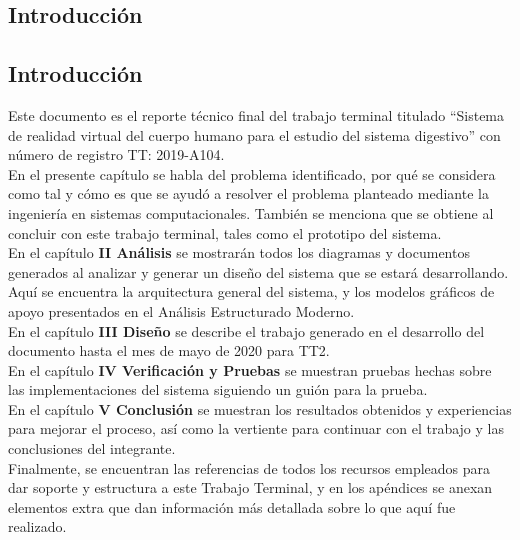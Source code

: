 \begin{center}
\chapter{Introducci\'on}
\end{center}

\newpage 
\section*{Introducci\'on}
\vfill
Este documento es el reporte técnico final del trabajo terminal titulado “Sistema de realidad virtual del cuerpo humano para el estudio del sistema digestivo” con número de registro TT: 2019-A104.\\
\newline
En el presente capítulo se habla del problema identificado, por qué se considera como tal y cómo es que se ayudó a resolver el problema planteado mediante la ingeniería en sistemas computacionales. También se menciona que se obtiene al concluir con este trabajo terminal, tales como el prototipo del sistema.\\
\newline
En el capítulo \textbf{II Análisis} se mostrarán todos los diagramas y documentos generados al analizar y generar un diseño del sistema que se estará desarrollando. Aquí se encuentra la arquitectura general del sistema, y los modelos gráficos de apoyo presentados en el Análisis Estructurado Moderno.\\
\newline
En el capítulo \textbf{III Diseño} se describe el trabajo generado en el desarrollo del documento hasta el mes de mayo de 2020 para TT2.\\
\newline
En el capítulo \textbf{IV Verificación y Pruebas} se muestran pruebas hechas sobre las implementaciones del sistema siguiendo un guión para la prueba.
 \newline\\
En el capítulo \textbf{V Conclusión} se muestran los resultados obtenidos y experiencias para mejorar el proceso, así como la vertiente para continuar con el trabajo y las conclusiones del integrante.
\newline\\
Finalmente, se encuentran las referencias de todos los recursos empleados para dar soporte y estructura a este Trabajo Terminal, y en los apéndices se anexan elementos extra que dan información más detallada sobre lo que aquí fue realizado.\\
\vfill 

